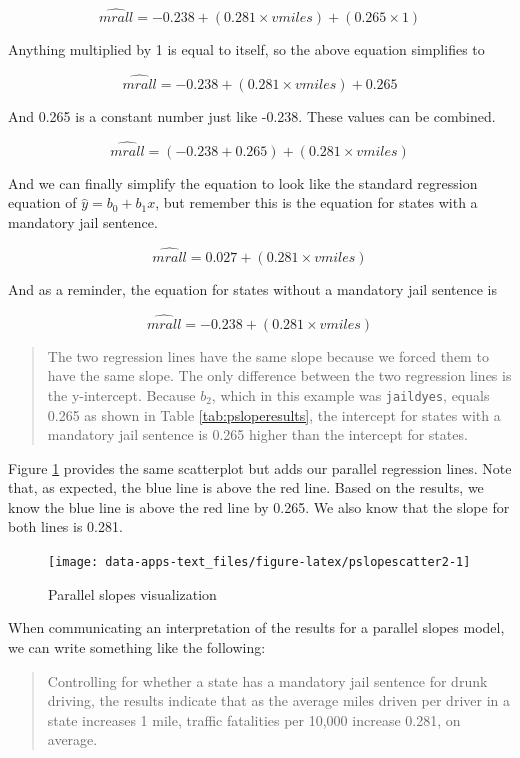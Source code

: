 \documentclass[
]{book}
\begin{document}
\[\hat{mrall} = -0.238 + (0.281 \times vmiles) + (0.265 \times 1)\]

Anything multiplied by 1 is equal to itself, so the above equation simplifies to

\[\hat{mrall} = -0.238 + (0.281 \times vmiles) + 0.265\]

And 0.265 is a constant number just like -0.238. These values can be combined.

\[\hat{mrall} = (-0.238 + 0.265) + (0.281\times vmiles)\]

And we can finally simplify the equation to look like the standard regression equation of \(\hat{y} = b_0 + b_1x\), but remember this is the equation for states with a mandatory jail sentence.

\[\hat{mrall} = 0.027 + (0.281\times vmiles)\]

And as a reminder, the equation for states without a mandatory jail sentence is

\[\hat{mrall} = -0.238 + (0.281\times vmiles)\]

\begin{quote}
The two regression lines have the same slope because we forced them to have the same slope. The only difference between the two regression lines is the y-intercept. Because \(b_2\), which in this example was \texttt{jaildyes}, equals 0.265 as shown in Table \ref{tab:psloperesults}, the intercept for states with a mandatory jail sentence is 0.265 higher than the intercept for states.
\end{quote}

Figure \ref{fig:pslopescatter2} provides the same scatterplot but adds our parallel regression lines. Note that, as expected, the blue line is above the red line. Based on the results, we know the blue line is above the red line by 0.265. We also know that the slope for both lines is 0.281.

\begin{figure}

{\centering \texttt{[image: data-apps-text\_files/figure-latex/pslopescatter2-1]} 

}

\caption{Parallel slopes visualization}\label{fig:pslopescatter2}
\end{figure}

When communicating an interpretation of the results for a parallel slopes model, we can write something like the following:

\begin{quote}
Controlling for whether a state has a mandatory jail sentence for drunk driving, the results indicate that as the average miles driven per driver in a state increases 1 mile, traffic fatalities per 10,000 increase 0.281, on average.
\end{quote}
\end{document}
